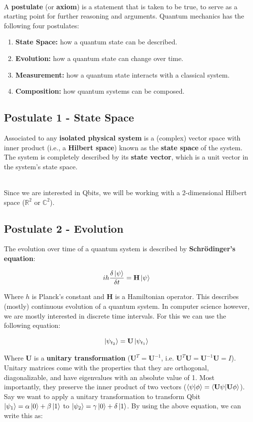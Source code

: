 \documentclass[12pt]{article}
\begin{document}
\noindent
\\
A \textbf{postulate} (or \textbf{axiom}) is a statement that is taken to be true, to serve as a starting point for further reasoning and arguments.
Quantum mechanics has the following four postulates:

\begin{enumerate}
    \item \textbf{State Space:} how a quantum state can be described.
    \item \textbf{Evolution:} how a quantum state can change over time.
    \item \textbf{Measurement:} how a quantum state interacts with a classical system.
    \item \textbf{Composition:} how quantum systems can be composed.
\end{enumerate}

\newpage
\subsection*{Postulate 1 - State Space}
Associated to any \textbf{isolated physical system} is a (complex) vector space with inner product (i.e., a \textbf{Hilbert space}) known as the \textbf{state space} of the system.
The system is completely described by its \textbf{state vector}, which is a unit vector in the system's state space.

\noindent
\\
Since we are interested in Qbits, we will be working with a 2-dimensional Hilbert space ($\mathbb{R}^2$ or $\mathbb{C}^2$).

\subsection*{Postulate 2 - Evolution}
The evolution over time of a quantum system is described by \textbf{Schrödinger's equation}:

\[ ih \frac{\delta \ket{\psi}}{\delta t} = \textbf{H}\ket{\psi} \]

\noindent
Where $h$ is Planck's constant and $\textbf{H}$ is a Hamiltonian operator.
This describes (mostly) continuous evolution of a quantum system.
In computer science however, we are mostly interested in discrete time intervals.
For this we can use the following equation:

\[ \ket{\psi_{t_2}} = \textbf{U} \ket{\psi_{t_1}} \]

\noindent
Where $\textbf{U}$ is a \textbf{unitary transformation} ($\textbf{U}^T = \textbf{U}^{-1}$, i.e. $\textbf{U}^T\textbf{U} = \textbf{U}^{-1}\textbf{U} = I$).
Unitary matrices come with the properties that they are orthogonal, diagonalizable, and have eigenvalues with an absolute value of 1.
Most importantly, they preserve the inner product of two vectors ($\braket{\psi | \phi} = \braket{\textbf{U}\psi | \textbf{U}\phi}$).
Say we want to apply a unitary transformation to transform Qbit $\ket{\psi_1} = \alpha \ket{0} + \beta \ket{1}$ to $\ket{\psi_2} = \gamma \ket{0} + \delta \ket{1}$.
By using the above equation, we can write this as:
\end{document}
